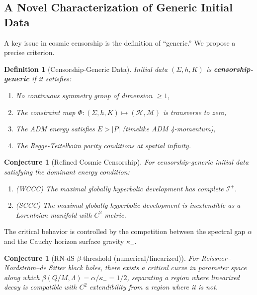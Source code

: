 \documentclass[12pt,a4paper]{article}
\newtheorem{conjecture}[theorem]{Conjecture}
\newtheorem{definition}[theorem]{Definition}
\newcommand{\Scri}{\mathscr{I}^+}
\begin{document}
\subsection{A Novel Characterization of Generic Initial Data}

A key issue in cosmic censorship is the definition of ``generic.'' We propose a precise criterion.

\begin{definition}[Censorship-Generic Data]
Initial data $(\Sigma, h, K)$ is \textbf{censorship-generic} if it satisfies:
\begin{enumerate}[label=(\roman*)]
    \item No continuous symmetry group of dimension $\geq 1$,
    \item The constraint map $\Phi: (\Sigma, h, K) \mapsto (\mathcal{H}, \mathcal{M})$ is transverse to zero,
    \item The ADM energy satisfies $E > |P|$ (timelike ADM 4-momentum),
    \item The Regge-Teitelboim parity conditions at spatial infinity.
\end{enumerate}
\end{definition}

\begin{conjecture}[Refined Cosmic Censorship]
For censorship-generic initial data satisfying the dominant energy condition:
\begin{enumerate}
    \item (WCCC) The maximal globally hyperbolic development has complete $\Scri$.
    \item (SCCC) The maximal globally hyperbolic development is inextendible as a Lorentzian manifold with $C^2$ metric.
\end{enumerate}
\end{conjecture}

The critical behavior is controlled by the competition between the spectral gap $\alpha$ and the Cauchy horizon surface gravity $\kappa_-$.

\begin{conjecture}[RN-dS $\beta$-threshold (numerical/linearized)]
For Reissner--Nordström--de Sitter black holes, there exists a critical curve in parameter space along which $\beta(Q/M,\Lambda)=\alpha/\kappa_- = 1/2$, separating a region where linearized decay is compatible with $C^2$ extendibility from a region where it is not.
\end{conjecture}
\end{document}
